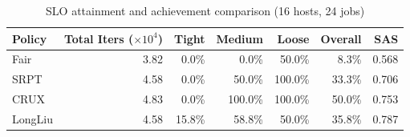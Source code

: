 \begin{table}[t]
\centering
\caption{SLO attainment and achievement comparison (16 hosts, 24 jobs)}
\label{tab:slo_16host}
\begin{tabular}{l|r|r|r|r|r|r}
\hline
Policy & Total Iters ($\times 10^4$) & Tight & Medium & Loose & Overall & SAS \\
\hline
Fair & 3.82 & 0.0\% & 0.0\% & 50.0\% & 8.3\% & 0.568 \\
SRPT & 4.58 & 0.0\% & 50.0\% & 100.0\% & 33.3\% & 0.706 \\
CRUX & 4.83 & 0.0\% & 100.0\% & 100.0\% & 50.0\% & 0.753 \\
LongLiu & 4.58 & 15.8\% & 58.8\% & 50.0\% & 35.8\% & 0.787 \\
\hline
\end{tabular}
\end{table}
